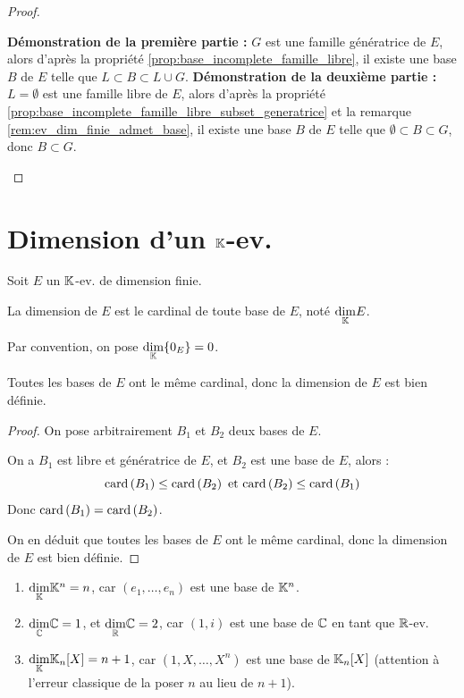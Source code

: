 \documentclass[12pt, a4paper]{report}
\begin{document}
\begin{proof}
    \begin{outline}
        \1 \textbf{Démonstration de la première partie :}
            \2 $G$ est une famille génératrice de $E$, alors d'après la propriété \ref{prop:base_incomplete_famille_libre}, il existe une base $B$ de $E$ telle que $L \subset B \subset L \cup G$.
        \1 \textbf{Démonstration de la deuxième partie :}
            \2 $L = \emptyset$ est une famille libre de $E$, alors d'après la propriété \ref{prop:base_incomplete_famille_libre_subset_generatrice} et la remarque \ref{rem:ev_dim_finie_admet_base}, il existe une base $B$ de $E$ telle que $\emptyset \subset B \subset G$, donc $B \subset G$.
    \end{outline}
\end{proof}

\section{Dimension d'un $\mathbb{K}$-ev.}

\begin{definition}
    Soit $E$ un $\mathbb{K}$-ev. de dimension finie.

    La dimension de $E$ est le cardinal de toute base de $E$, noté $\underset{\mathbb{K}}\dim E$.

    Par convention, on pose $\underset{\mathbb{K}}\dim \{0_E\} = 0$.
\end{definition}

\begin{theorem}
    Toutes les bases de $E$ ont le même cardinal, donc la dimension de $E$ est bien définie.
\end{theorem}

\begin{proof}
    On pose arbitrairement $B_1$ et $B_2$ deux bases de $E$.
    \begin{outline}
        \1 On a $B_1$ est libre et génératrice de $E$, et $B_2$ est une base de $E$, alors :
        $$\mathrm{card}\left(B_1\right) \le \mathrm{card}\left(B_2\right) \text{ et } \mathrm{card}\left(B_2\right) \le \mathrm{card}\left(B_1\right)$$
        \1 Donc $\mathrm{card}\left(B_1\right) = \mathrm{card}\left(B_2\right)$.
    \end{outline}
    On en déduit que toutes les bases de $E$ ont le même cardinal, donc la dimension de $E$ est bien définie.
\end{proof}

\begin{example}
    \begin{enumerate}
        \item $\underset{\mathbb{K}}\dim \mathbb{K}^n = n$, car $(e_1,\dots,e_n)$ est une base de $\mathbb{K}^n$.
        \item $\underset{\mathbb{C}}\dim \mathbb{C} = 1$, et $\underset{\mathbb{R}}\dim \mathbb{C} = 2$, car $(1,i)$ est une base de $\mathbb{C}$ en tant que $\mathbb{R}$-ev.
        \item $\underset{\mathbb{K}}\dim \mathbb{K}_n[X] = n+1$, car $(1,X,\dots,X^n)$ est une base de $\mathbb{K}_n[X]$ (attention à l'erreur classique de la poser $n$ au lieu de $n+1$).
    \end{enumerate}
\end{example}
\end{document}

